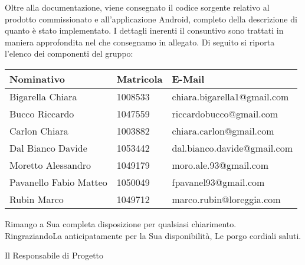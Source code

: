 \documentclass{letter}
\begin{document}
\begin{letter}{}
	Oltre alla documentazione, viene consegnato il codice sorgente relativo al prodotto commissionato e all'applicazione Android, completo della descrizione di quanto è stato implementato.
	I dettagli inerenti il consuntivo sono trattati in maniera approfondita nel  che consegnamo in allegato.
	Di seguito si riporta l'elenco dei componenti del gruppo:
	\begin{center}
		\begin{tabu}{|p{4cm}|p{2.5cm}|p{5cm}|}
		\hline
			\rowfont{\bf}
			\textbf{Nominativo} & \textbf{Matricola} & \textbf{E-Mail} \\ \hline
			Bigarella Chiara & 1008533 & chiara.bigarella1@gmail.com \\ \hline
			Bucco Riccardo & 1047559 & riccardobucco@gmail.com \\ \hline
			Carlon Chiara & 1003882 & chiara.carlon@gmail.com \\ \hline
			Dal Bianco Davide & 1053442 & dal.bianco.davide@gmail.com \\ \hline
			Moretto Alessandro & 1049179 & moro.ale.93@gmail.com \\ \hline
			Pavanello Fabio Matteo & 1050049 & fpavanel93@gmail.com \\ \hline
			Rubin Marco & 1049712 & marco.rubin@loreggia.com \\ \hline
		\end{tabu}
	\end{center}

	Rimango a Sua completa disposizione per qualsiasi chiarimento.\\
	RingraziandoLa anticipatamente per la Sua disponibilità, Le porgo cordiali saluti.
	
	\closing{
		Il Responsabile di Progetto \\ [1cm]
		 \\
	}

\end{letter}
\end{document}
